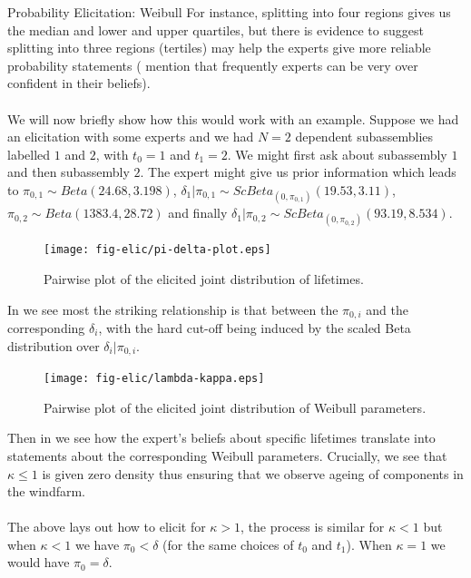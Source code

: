 \begin{chapter}{Probability Elicitation: Weibull \label{Chap:elic-weib}}
 For instance, splitting into four regions gives us the median and lower and upper quartiles, but there is evidence to suggest splitting into three regions (tertiles) may help the experts give more reliable probability statements (\cite{Ohagan06} mention that frequently experts can be very over confident in their beliefs).\\\\
 
 We will now briefly show how this would work with an example. Suppose we had an elicitation with some experts and we had $N = 2$ dependent subassemblies labelled $1$ and $2$, with $t_0 = 1$ and $t_1 = 2$. We might first ask about subassembly $1$ and then subassembly $2$. The expert might give us prior information which leads to  $\pi_{0,1} \sim Beta(24.68, 3.198)$, $\delta_1 | \pi_{0,1} \sim ScBeta_{(0, \pi_{0,1})}(19.53, 3.11)$, $\pi_{0,2} \sim Beta(1383.4, 28.72)$ and finally $\delta_1 | \pi_{0,2} \sim ScBeta_{(0, \pi_{0,2})}(93.19, 8.534)$.
 \begin{figure}
 	\centering
 	\texttt{[image: fig-elic/pi-delta-plot.eps]}
 	\caption{Pairwise plot of the elicited joint distribution of lifetimes.}
 	\label{Fig:pi-delta1}
 \end{figure}
 In  we see most the striking relationship is that between the $\pi_{0,i}$ and the corresponding $\delta_i$, with the hard cut-off being induced by the scaled Beta distribution over $\delta_i | \pi_{0,i}$.
 \begin{figure}
 	\centering
 	\texttt{[image: fig-elic/lambda-kappa.eps]}
 	\caption{Pairwise plot of the elicited joint distribution of Weibull parameters.}
 	\label{Fig:lambda-kappa1}
 \end{figure}
 Then in  we see how the expert's beliefs about specific lifetimes translate into statements about the corresponding Weibull parameters. Crucially, we see that $\kappa\leq 1$ is given zero density thus ensuring that we observe ageing of components in the windfarm.\\\\
 
 The above lays out how to elicit for $\kappa >1$, the process is similar for $\kappa<1$ but when $\kappa<1$ we have $\pi_0 < \delta$ (for the same choices of $t_0$ and $t_1$). When $\kappa = 1$ we would have $\pi_0 = \delta$.
\end{chapter}
